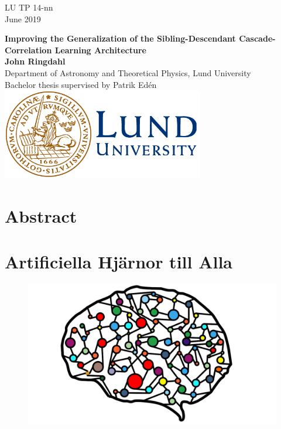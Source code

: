 \documentclass[a4paper,11pt, usenatbib]{article}
\begin{document}
\begin{titlepage}
\begin{flushright}
LU TP 14-nn\\
June 2019\\
\end{flushright}
\vfill
\begin{center}
{\large\bf Improving the Generalization of the Sibling-Descendant Cascade-Correlation Learning Architecture}
\\[3cm]
{\bf John Ringdahl}
\\[5mm]
{Department of Astronomy and Theoretical Physics, Lund University}
\\[2cm]
{Bachelor thesis supervised by Patrik Edén}
\vfill
\includegraphics[height=4cm]{logocLUeng.png}
\end{center}
\end{titlepage}
\thispagestyle{empty} %

\phantom{p}
\vfill

\section*{Abstract}


\vfill
\newpage
\section*{Artificiella Hjärnor till Alla}
 \begin{figure}
 \includegraphics[width=0.38 \textwidth, trim={9cm, 0, 10cm, 0}, clip]{artificial-neural-network-3501528_1920}
 \end{figure}
 
\end{document}
